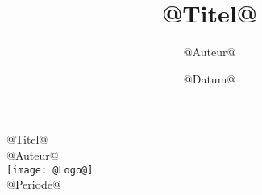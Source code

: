 \documentclass[twocolumn,a4paper,10pt]{report}
\title{@Titel@}
\author{@Auteur@}
\date{@Datum@}
\begin{document}
\begin{titlepage}
  \begin{center}
    \huge @Titel@ \\
    \vspace{1in}
    \large @Auteur@ \\
    \vspace{2in}
    \texttt{[image: @Logo@]} \\
    \vspace{1in}
    \large @Periode@ \\
  \end{center}
\end{titlepage}

\begin{landscape}
  \begin{center}
  \end{center}
\end{landscape}
\newpage
\end{document}
